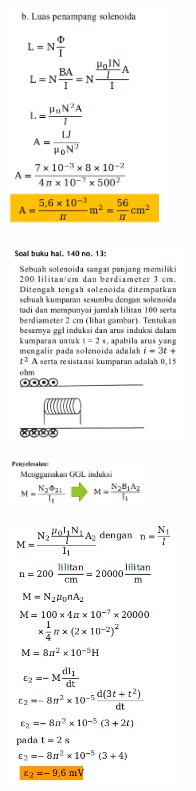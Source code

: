\documentclass[twocolumn, 11pt]{article}%
\begin{document}
\begin{center}
    \includegraphics[width=160px]{7.png}
\end{center}

\begin{center}
    \includegraphics[width=180px]{8.png}
\end{center}

\begin{center}
    \includegraphics[width=140px]{9.png}
\end{center}

\begin{center}
    \includegraphics[width=170px]{10.png}
\end{center}
\end{document}
